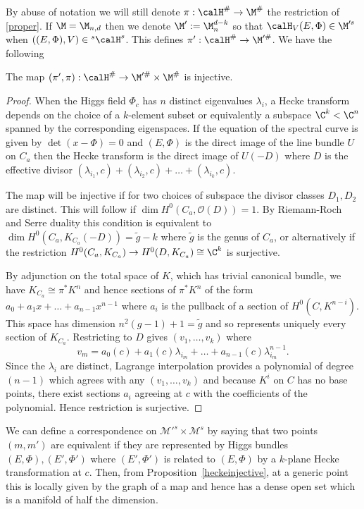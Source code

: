 By abuse of notation we will still denote $\pi:\calH^\# \to \M^\#$ the restriction of \eqref{proper}. If  $\M=\M_{n,d}$ then we denote $\M^\prime:=\M_{n}^{d-k}$ so that $\calH_V(E,\Phi)\in \M^{\prime s}$ when $((E,\Phi),V)\in {}^{s}\calH^s$.  This defines $\pi^\prime:\calH^\#\to \M^{\prime\#}$.  We have the following
\begin{proposition}
\notready\label{heckeinjective} The map
	$(\pi^\prime,\pi):\calH^\#\to \M^{\prime \#}\times  \M^\#$ is injective.
\end{proposition}
\begin{proof}
	When the Higgs field $\Phi_c$ has $n$ distinct eigenvalues $\lambda_i$, a Hecke transform depends on the choice of  a $k$-element subset  or equivalently a subspace $\C^k< \C^n$ spanned by the corresponding eigenspaces.  If the equation of the spectral curve is given by $\det (x-\Phi)=0$ and $(E,\Phi)$ is the direct image of the line bundle $U$ on $C_a$ then the Hecke transform is the direct image of $U(-D)$  where $D$ is the effective divisor $(\lambda_{i_1},c)+(\lambda_{i_2},c)+\dots +(\lambda_{i_k},c)$.

	The map will be injective if for two choices  of subspace the divisor classes $D_1,D_2$ are distinct. This will follow if $\dim H^0(C_a, {\mathcal O}(D))=1$.
	By Riemann-Roch and Serre duality this condition is equivalent to $\dim H^0( C_a, K_{C_a}(-D))=\tilde g-k$ where $\tilde g$ is the genus of $ C_a$, or alternatively if  the restriction $H^0(C_a, K_{ C_a})\rightarrow H^0(D, K_{ C_a})\cong \C^k$ is surjective.

	By adjunction on the total space of $K$, which has trivial canonical bundle, we have $K_{ C_a} \cong \pi^*K^n$ and hence sections of $\pi^*K^n$ of the form $a_0+a_1x+\dots +a_{n-1}x^{n-1}$ where $a_i$ is the pullback of a section of $H^0(C,K^{n-i})$. This space has dimension $n^2(g-1)+1=\tilde g$ and so represents uniquely  every section of $K_{ C_a}$. Restricting to $D$ gives $(v_1,\dots, v_k)$ where
	$$v_m=a_0(c)+a_1(c)\lambda_{i_m}+\dots +a_{n-1}(c)\lambda_{i_m}^{n-1}.$$
	Since the $\lambda_i$ are distinct, Lagrange interpolation provides a polynomial of degree $(n-1)$ which agrees with any $(v_1,\dots, v_k)$ and because $K^i$ on $C$ has no base points, there exist sections $a_i$ agreeing at $c$ with the coefficients of the polynomial. Hence restriction is surjective.
\end{proof}

We can define a correspondence on ${\mathcal M}'^s\times {\mathcal M}^s$ by saying that two points $(m,m')$ are equivalent if they are represented by Higgs bundles $(E,\Phi), (E',\Phi')$ where $(E',\Phi')$ is related to $(E,\Phi)$ by a $k$-plane Hecke transformation at $c$. Then, from Proposition~\ref{heckeinjective},
at a generic point this is locally given by the graph of a map and hence has a dense open set which is a manifold of half the dimension.





